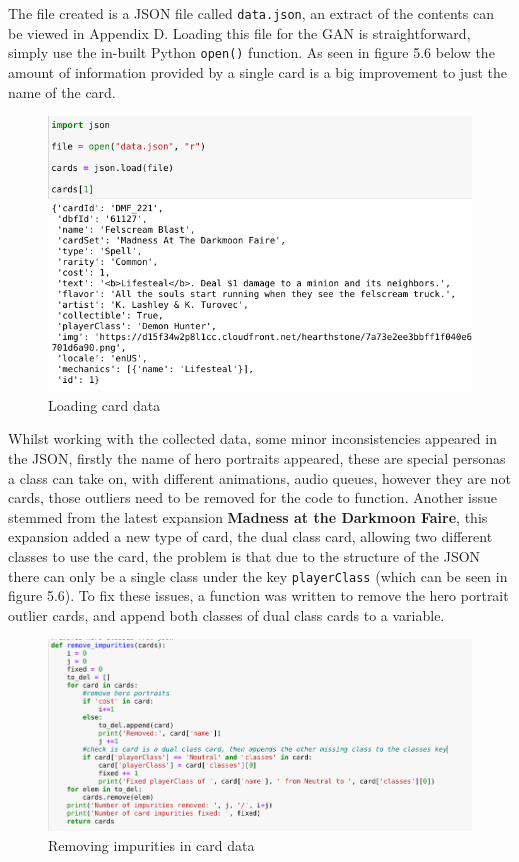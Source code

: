 \documentclass{report} %
\begin{document}
The file created is a JSON file called \nolinkurl{data.json}, an extract of the contents can be viewed in Appendix D.  Loading this file for the GAN is straightforward, simply use the in-built Python \nolinkurl{open()} function. As seen in figure 5.6 below the amount of information provided by a single card is a big improvement to just the name of the card.

\begin{figure}[H]
\centering
\includegraphics[width=1\textwidth]{jsonOpen}
\caption{Loading card data\protect}
\label{board}
\end{figure}

Whilst working with the collected data, some minor inconsistencies appeared in the JSON, firstly the name of hero portraits appeared, these are special personas a class can take on, with different animations, audio queues, however they are not cards, those outliers need to be removed for the code to function. Another issue stemmed from the latest expansion \textbf{Madness at the Darkmoon Faire}, this expansion added a new type of card, the dual class card, allowing two different classes to use the card, the problem is that due to the structure of the JSON there can only be a single class under the key \nolinkurl{playerClass} (which can be seen in figure 5.6). To fix these issues, a function was written to remove the hero portrait outlier cards, and append both classes of dual class cards to a variable.

\begin{figure}[H]
\centering
\includegraphics[width=1.25\textwidth]{impure}
\caption{Removing impurities in card data\protect}
\label{board}
\end{figure}
\end{document}
